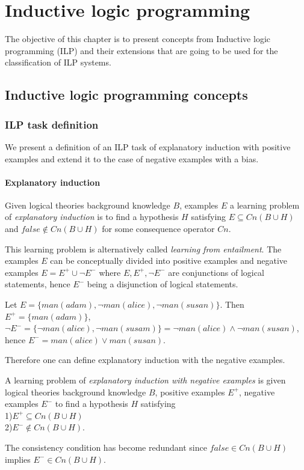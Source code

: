 \chapter{Inductive logic programming}\label{ch:inductive_logic_programming}
The objective of this chapter is to present concepts from Inductive logic programming (ILP) and their extensions that are going to be used for the classification of ILP systems.

\section{Inductive logic programming concepts}

\subsection{ILP task definition}
We present a definition of an ILP task of explanatory induction with positive examples and extend it to the case of negative examples with a bias.

\subsubsection{Explanatory induction\cite{yamamoto2012inverse}}
\begin{defn}\cite{flach1996rationality} Given logical theories background knowledge $B$, examples $E$ a learning problem of \emph{explanatory induction} is  to find a hypothesis $H$ satisfying $E \subseteq Cn(B \cup H)$ and $false \not\in Cn(B \cup H)$ for some consequence operator $Cn$.
\end{defn}

This learning problem is alternatively called \emph{learning from entailment}\cite{muggleton1995inverse}\cite{de1997logical}. The examples $E$ can be conceptually divided into positive examples and negative examples $E=E^{+} \cup \neg E^{-}$ where $E, E^{+}, \neg E^{-}$ are conjunctions of logical statements, hence $E^{-}$ being a disjunction of logical statements.

\begin{exmp}\cite{explanatory_induction_example}
Let $E=\{man(adam), \neg man(alice), \neg man(susan)\}$. Then $E^{+}=\{man(adam)\}$,
$\neg E^{-} = \{\neg man(alice), \neg man(susam)\}=\neg man(alice) \land \neg man(susan)$, hence
$E^{-} = man(alice) \lor man(susan)$.
\end{exmp}

Therefore one can define explanatory induction with the negative examples.
\begin{defn}\label{explanatory_induction_with_negative_examples_definition}
A learning problem of \emph{explanatory induction with negative examples} is given logical theories background knowledge $B$, positive examples $E^{+}$, negative examples $E^{-}$ to find a hypothesis $H$ satisfying\\
1)$E^{+} \subseteq Cn(B \cup H)$\\
2)$E^{-} \not\in Cn(B \cup H)$.
\end{defn}
The consistency condition has become redundant since $false \in Cn(B \cup H)$ implies $E^{-} \in Cn(B \cup H)$.

